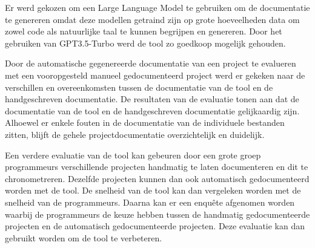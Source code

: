 Er werd gekozen om een Large Language Model te gebruiken om de documentatie te genereren omdat deze modellen getraind zijn op grote hoeveelheden data om zowel code als natuurlijke taal te kunnen begrijpen en genereren.
Door het gebruiken van GPT3.5-Turbo werd de tool zo goedkoop mogelijk gehouden.

Door de automatische gegenereerde documentatie van een project te evalueren met een vooropgesteld manueel gedocumenteerd project werd er gekeken naar de verschillen en overeenkomsten tussen de documentatie van de tool en de handgeschreven documentatie.
De resultaten van de evaluatie tonen aan dat de documentatie van de tool en de handgeschreven documentatie gelijkaardig zijn.
Alhoewel er enkele fouten in de documentatie van de individuele bestanden zitten, blijft de gehele projectdocumentatie overzichtelijk en duidelijk.

Een verdere evaluatie van de tool kan gebeuren door een grote groep programmeurs verschillende projecten handmatig te laten documenteren en dit te chronometreren. 
Dezelfde projecten kunnen dan ook automatisch gedocumenteerd worden met de tool. De snelheid van de tool kan dan vergeleken worden met de snelheid van de programmeurs.
Daarna kan er een enquête afgenomen worden waarbij de programmeurs de keuze hebben tussen de handmatig gedocumenteerde projecten en de automatisch gedocumenteerde projecten.
Deze evaluatie kan dan gebruikt worden om de tool te verbeteren.







